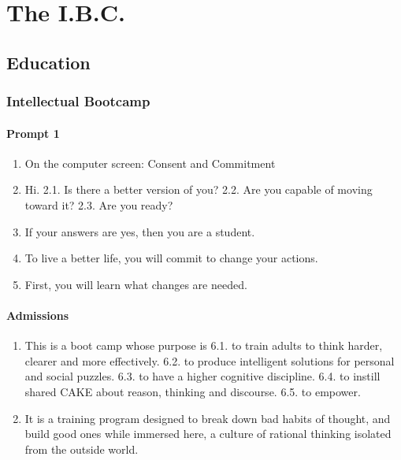 \documentclass[
]{book}
\providecommand{\tightlist}{%
  \setlength{\itemsep}{0pt}\setlength{\parskip}{0pt}}
\begin{document}
\hypertarget{part-the-i.b.c.}{%
\part{The I.B.C.}\label{part-the-i.b.c.}}

\hypertarget{education}{%
\chapter{Education}\label{education}}

\hypertarget{intellectual-bootcamp}{%
\section{Intellectual Bootcamp}\label{intellectual-bootcamp}}

\hypertarget{prompt-1}{%
\subsection{Prompt 1}\label{prompt-1}}

\begin{enumerate}
\def\labelenumi{\arabic{enumi}.}
\tightlist
\item
  On the computer screen:
  Consent and Commitment
\item
  Hi.
  2.1. Is there a better version of you?
  2.2. Are you capable of moving toward it?
  2.3. Are you ready?
\item
  If your answers are yes, then you are a student.
\item
  To live a better life, you will commit to change your actions.
\item
  First, you will learn what changes are needed.
\end{enumerate}

\hypertarget{admissions}{%
\subsection{Admissions}\label{admissions}}

\begin{enumerate}
\def\labelenumi{\arabic{enumi}.}
\setcounter{enumi}{5}
\tightlist
\item
  This is a boot camp whose purpose is
  6.1. to train adults to think harder, clearer and more effectively.
  6.2. to produce intelligent solutions for personal and social puzzles.
  6.3. to have a higher cognitive discipline.
  6.4. to instill shared CAKE about reason, thinking and discourse.
  6.5. to empower.
\item
  It is a training program designed to break down bad habits of thought, and build
  good ones while immersed here, a culture of rational thinking isolated from the
  outside world.
\end{enumerate}
\end{document}
